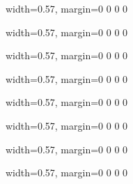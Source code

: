 \documentclass{jtacs}
\numberwithin{equation}{section}
\begin{document}
\begin{center}
\begin{adjustbox}{width=0.57\textwidth, margin=0 0 0 0}

\end{adjustbox}
\end{center}

\begin{center}
\begin{adjustbox}{width=0.57\textwidth, margin=0 0 0 0}

\end{adjustbox}
\end{center}

\begin{center}
\begin{adjustbox}{width=0.57\textwidth, margin=0 0 0 0}

\end{adjustbox}
\end{center}

\begin{center}
\begin{adjustbox}{width=0.57\textwidth, margin=0 0 0 0}

\end{adjustbox}
\end{center}

\begin{center}
\begin{adjustbox}{width=0.57\textwidth, margin=0 0 0 0}

\end{adjustbox}
\end{center}

\begin{center}
\begin{adjustbox}{width=0.57\textwidth, margin=0 0 0 0}

\end{adjustbox}
\end{center}

\begin{center}
\begin{adjustbox}{width=0.57\textwidth, margin=0 0 0 0}

\end{adjustbox}
\end{center}

\begin{center}
\begin{adjustbox}{width=0.57\textwidth, margin=0 0 0 0}

\end{adjustbox}
\end{center}
\end{document}
